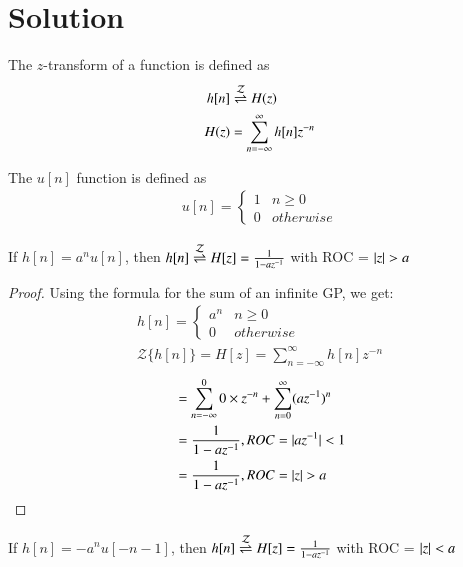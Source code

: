 \documentclass[journal,12pt,twocolumn]{IEEEtran}
\begin{document}
\section*{Solution}
\begin{definition}\label{def:z}
    The $z$-transform of a function is defined as
    \begin{align}
        h[n] &\overset{\mathcal{Z}}{ \rightleftharpoons} H(z)\\
        H(z) &=\sum_{n=-\infty}^{\infty} h[n]z^{-n}
    \end{align}
\end{definition}
\begin{definition}\label{def:u_n}
    The $u[n]$ function is defined as
    \begin{align}
        u[n] = 
        \begin{cases}
        1 & n\geq0\\
        0 & otherwise
        \end{cases}
    \end{align}
\end{definition}
\begin{lemma}
If $h[n] = a^nu[n]$, then $h[n] \overset{\mathcal{Z}}{ \rightleftharpoons} H[z] = \frac{1}{1 - az^{-1}}$ with ROC = $\vert z\vert>a$
\label{0}
\end{lemma}
\begin{proof}
Using the formula for the sum of an infinite GP, we get:
\begin{align}
    h[n] = 
    \begin{cases}
    a^n & n\geq 0\\
    0 & otherwise
    \end{cases}\\
    \mathcal{Z}\{h[n]\} = H[z] = \sum_{n = -\infty}^\infty h[n]z^{-n}
\end{align}
\begin{align}
    &= \sum_{n = -\infty}^0 0 \times z^{-n} + \sum_{n = 0}^{\infty} (az^{-1})^n\\
    &= \frac{1}{1 - az^{-1}} , ROC = \vert az^{-1}\vert < 1\\
    &= \frac{1}{1 - az^{-1}} , ROC =  \vert z\vert > a
\end{align}
\end{proof}
\begin{lemma}
If $h[n] = -a^nu[-n-1]$, then $h[n] \overset{\mathcal{Z}}{ \rightleftharpoons} H[z] = \frac{1}{1 - az^{-1}}$ with ROC = $\vert z\vert<a$ 
\label{1}
\end{lemma}
\end{document}

